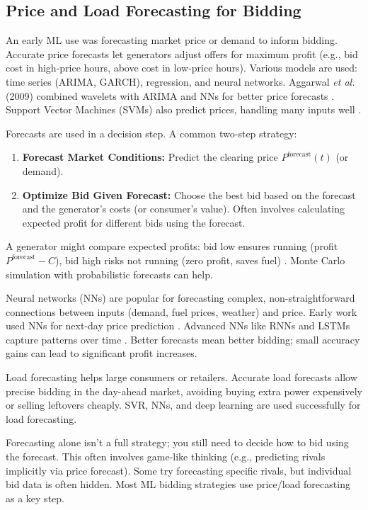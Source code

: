 \documentclass[conference]{IEEEtran}
\begin{document}
\subsection{Price and Load Forecasting for Bidding}

An early ML use was forecasting market price or demand to inform bidding. Accurate price forecasts let generators adjust offers for maximum profit (e.g., bid cost in high-price hours, above cost in low-price hours). Various models are used: time series (ARIMA, GARCH), regression, and neural networks. Aggarwal \textit{et al.} (2009) combined wavelets with ARIMA and NNs for better price forecasts \cite{Aggarwal2009}. Support Vector Machines (SVMs) also predict prices, handling many inputs well \cite{Mohandes2002}.

Forecasts are used in a decision step. A common two-step strategy:
\begin{enumerate}
    \item \textbf{Forecast Market Conditions:} Predict the clearing price $P^{\text{forecast}}(t)$ (or demand).
    \item \textbf{Optimize Bid Given Forecast:} Choose the best bid based on the forecast and the generator's costs (or consumer's value). Often involves calculating expected profit for different bids using the forecast.
\end{enumerate}
A generator might compare expected profits: bid low ensures running (profit $P^{\text{forecast}} - C$), bid high risks not running (zero profit, saves fuel) \cite{Bunn1999}. Monte Carlo simulation with probabilistic forecasts can help.

Neural networks (NNs) are popular for forecasting complex, non-straightforward connections between inputs (demand, fuel prices, weather) and price. Early work used NNs for next-day price prediction \cite{Nagarajan1999}. Advanced NNs like RNNs and LSTMs capture patterns over time \cite{Chen2004}. Better forecasts mean better bidding; small accuracy gains can lead to significant profit increases.

Load forecasting helps large consumers or retailers. Accurate load forecasts allow precise bidding in the day-ahead market, avoiding buying extra power expensively or selling leftovers cheaply. SVR, NNs, and deep learning are used successfully for load forecasting.

Forecasting alone isn't a full strategy; you still need to decide how to bid using the forecast. This often involves game-like thinking (e.g., predicting rivals implicitly via price forecast). Some try forecasting specific rivals, but individual bid data is often hidden. Most ML bidding strategies use price/load forecasting as a key step.
\end{document}
